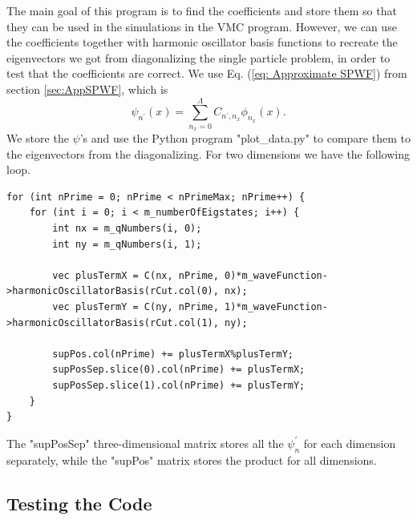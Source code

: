 \documentclass[../main.tex]{subfiles}
\begin{document}
The main goal of this program is to find the coefficients and store them so that they can be used in the simulations in the VMC program. However, we can use the coefficients together with harmonic oscillator basis functions to recreate the eigenvectors we got from diagonalizing the single particle problem, in order to test that the coefficients are correct. We use Eq. (\ref{eq: Approximate SPWF}) from section \ref{sec:AppSPWF}, which is
\begin{equation}\label{eq: Approximate SPWF2}
    \psi_{n^\prime}(x) = \sum_{n_x=0}^{\Lambda} C_{n^\prime,n_x} \phi_{n_x}(x).
\end{equation}
We store the $\psi$'s and use the Python program "plot\_data.py" to compare them to the eigenvectors from the diagonalizing. For two dimensions we have the following loop.
\lstset{language=c++}
\begin{lstlisting}[caption={}]
for (int nPrime = 0; nPrime < nPrimeMax; nPrime++) {
    for (int i = 0; i < m_numberOfEigstates; i++) {
        int nx = m_qNumbers(i, 0);
        int ny = m_qNumbers(i, 1);

        vec plusTermX = C(nx, nPrime, 0)*m_waveFunction->harmonicOscillatorBasis(rCut.col(0), nx);
        vec plusTermY = C(ny, nPrime, 1)*m_waveFunction->harmonicOscillatorBasis(rCut.col(1), ny);

        supPos.col(nPrime) += plusTermX%plusTermY;
        supPosSep.slice(0).col(nPrime) += plusTermX;
        supPosSep.slice(1).col(nPrime) += plusTermY;
    }
}
\end{lstlisting}
The "supPosSep" three-dimensional matrix stores all the $\psi_n^\prime$ for each dimension separately, while the "supPos" matrix stores the product for all dimensions.




\subsection{Testing the Code}
\end{document}
